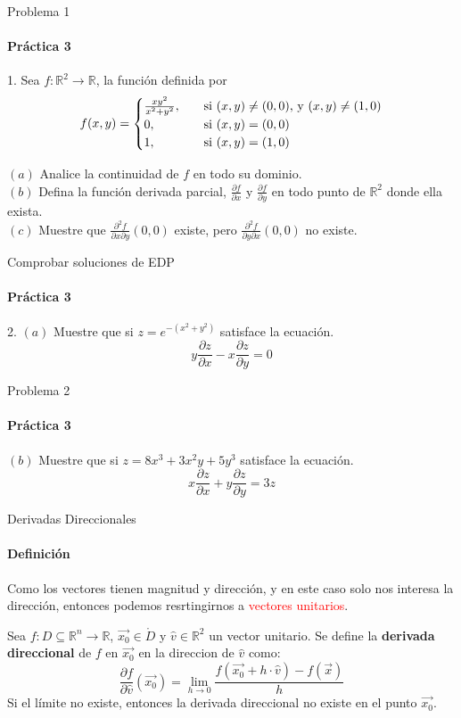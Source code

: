 \documentclass{plantillaPPT}
\begin{document}
\begin{frame}{Problema 1}
\framesubtitle{Práctica 3}

1. Sea \(f:\mathbb{R}^2\to\mathbb{R}\), la función definida por
\[
f(x,y) = 
\begin{cases}
        \frac{xy^2}{x^2+y^2}, \quad & \text{si } (x,y) \neq (0,0)\text{, y } (x,y) \neq (1,0) \\
    \centering 0, \quad &\text{si } (x,y) = (0,0) \\
    \centering 1, \quad &\text{si } (x,y) = (1,0)
\end{cases}
\]

\((a)\) Analice la continuidad de \(f\) en todo su dominio. \\
\((b)\) Defina la función derivada parcial, \(\frac{\partial f}{\partial x}\) y \(\frac{\partial f}{\partial y}\) en todo punto de \(\mathbb{R}^2\) donde ella exista.\\
\((c)\) Muestre que \(\frac{\partial^2f}{\partial x\partial y}(0,0)\) existe, pero \(\frac{\partial^2f}{\partial y\partial x}(0,0)\) no existe.

\end{frame}

\begin{frame}{Comprobar soluciones de EDP}
\framesubtitle{Práctica 3}

2. \((a)\) Muestre que si \(z = e^{-(x^2+y^2)}\) satisface la ecuación.
\[
y\frac{\partial z}{\partial x}-x\frac{\partial z}{\partial y} = 0    
\]
    
\end{frame}

\begin{frame}{Problema 2}
\framesubtitle{Práctica 3}

\((b)\) Muestre que si \(z=8x^3+3x^2y+5y^3\) satisface la ecuación.
\[
x\frac{\partial z}{\partial x}+y\frac{\partial z}{\partial y} = 3z
\]
    
\end{frame}

\begin{frame}{Derivadas Direccionales}
\framesubtitle{Definición}
Como los vectores tienen magnitud y dirección, y en este caso solo nos interesa la dirección, entonces podemos resrtingirnos a \textcolor{red}{vectores unitarios}.
\begin{definicion}
    Sea \(f:D\subseteq \mathbb{R}^n\to\mathbb{R}\), \(\vec{x_0}\in \mathring{D}\) y \(\hat{v}\in\mathbb{R}^2\) un vector unitario. Se define la \textbf{derivada direccional} de \(f\) en \(\vec{x_0}\) en la direccion de \(\hat{v}\) como:
    \vspace{-0.3cm}
    \[
    \frac{\partial f}{\partial \hat{v}}(\vec{x_0}) = \lim_{h\to0}\frac{f(\vec{x_0}+h\cdot \hat{v}) - f(\vec{x})}{h}
    \]
    Si el límite no existe, entonces la derivada direccional no existe en el punto \(\vec{x_0}\).
    
\end{definicion}
    
\end{frame}
\end{document}
